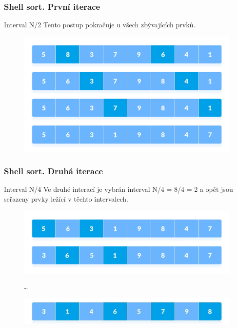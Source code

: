 \documentclass[12pt]{beamer}
\begin{document}
\begin{frame}
    \frametitle{Shell sort. První iterace}
    \fontsize{14pt}{12pt}\selectfont
    \centering
    \begin{block}{Interval N/2}
    Tento postup pokračuje u všech zbývajících prvků.
    \end{block}
    
    \begin{figure}[htb]
    
    \includegraphics[scale=0.225]{2.jpg}
    
    \end{figure}
    
\end{frame}

\begin{frame}
    \frametitle{Shell sort. Druhá iterace}
    \fontsize{12pt}{12pt}\selectfont
    \begin{block}{Interval N/4}
    Ve druhé interací je vybrán interval N/4 = 8/4 = 2 a opět jsou seřazeny prvky ležící v těchto intervalech.
    \end{block}
    
    \begin{figure}[htb]
        \centering
        \includegraphics[scale=0.2]{3.jpg}
        
        {\Huge\dots}
        \vspace{\baselineskip}
        
        \includegraphics[scale=0.2]{4.jpg}
    \end{figure}
    
\end{frame}
\end{document}

